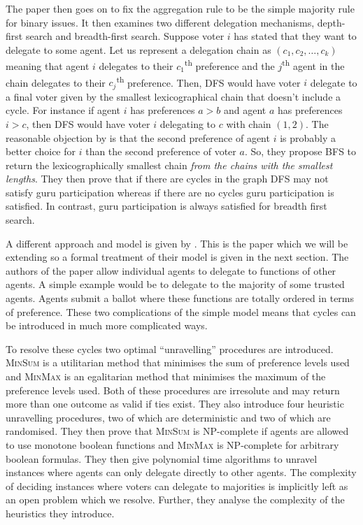 \documentclass[11pt,a4paper, titlepage]{article}
\theoremstyle{definition}
\begin{document}
The paper then goes on to fix the aggregation rule to be the simple majority rule for binary issues. It then examines two different delegation mechanisms, depth-first search and breadth-first search.
Suppose voter $i$ has stated that they want to delegate to some agent. Let us represent a delegation chain as $(c_1, c_2, \ldots, c_k)$ meaning that agent $i$ delegates to their $c_1$\textsuperscript{th} preference and the $j$\textsuperscript{th} agent in the chain delegates to their $c_j$\textsuperscript{th} preference.
Then, DFS would have voter $i$ delegate to a final voter given by the smallest lexicographical chain that doesn't include a cycle. For instance if agent $i$ has preferences $a > b$ and agent $a$ has preferences $i > c$, then DFS would have voter $i$ delegating to $c$ with chain $(1, 2)$.
The reasonable objection by \citeauthor{kotsialou} is that the second preference of agent $i$ is probably a better choice for $i$ than the second preference of voter $a$.
So, they propose BFS to return the lexicographically smallest chain \emph{from the chains with the smallest lengths}.
They then prove that if there are cycles in the graph DFS may not satisfy guru participation whereas if there are no cycles guru participation is satisfied. In contrast, guru participation is always satisfied for breadth first search.

A different approach and model is given by \citet{grandi}. This is the paper which we will be extending so a formal treatment of their model is given in the next section.
The authors of the paper allow individual agents to delegate to functions of other agents. A simple example would be to delegate to the majority of some trusted agents.
Agents submit a ballot where these functions are totally ordered in terms of preference.
These two complications of the simple model means that cycles can be introduced in much more complicated ways.

To resolve these cycles two optimal ``unravelling'' procedures are introduced. \textsc{MinSum} is a utilitarian method that minimises the sum of preference levels used and \textsc{MinMax} is an egalitarian method that minimises the maximum of the preference levels used.
Both of these procedures are irresolute and may return more than one outcome as valid if ties exist.
They also introduce four heuristic unravelling procedures, two of which are deterministic and two of which are randomised.
They then prove that \textsc{MinSum} is NP-complete if agents are allowed to use monotone boolean functions  and \textsc{MinMax} is NP-complete for arbitrary boolean formulas.
They then give polynomial time algorithms to unravel instances where agents can only delegate directly to other agents.
The complexity of deciding instances where voters can delegate to majorities is implicitly left as an open problem which we resolve.
Further, they analyse the complexity of the heuristics they introduce.
\end{document}
